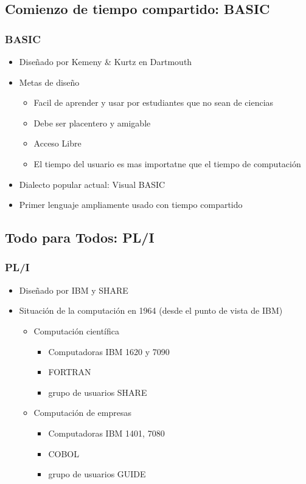 \documentclass[11pt]{article}
\begin{document}
\subsection*{Comienzo de tiempo compartido: BASIC}
\label{sec:orgheadline70}

\subsubsection*{BASIC}
\label{sec:orgheadline69}
\begin{itemize}
\item Diseñado por Kemeny \& Kurtz en Dartmouth
\item Metas de diseño
\begin{itemize}
\item Facil de aprender y usar por estudiantes que no sean de ciencias
\item Debe ser placentero y amigable
\item Acceso Libre
\item El tiempo del usuario es mas importatne que el tiempo de computación
\end{itemize}
\item Dialecto popular actual: Visual BASIC
\item Primer lenguaje ampliamente usado con tiempo compartido
\end{itemize}

\subsection*{Todo para Todos: PL/I}
\label{sec:orgheadline75}

\subsubsection*{PL/I}
\label{sec:orgheadline71}
\begin{itemize}
\item Diseñado por IBM y SHARE
\item Situación de la computación en 1964 (desde el punto de vista de IBM)
\begin{itemize}
\item Computación científica
\begin{itemize}
\item Computadoras IBM 1620 y 7090
\item FORTRAN
\item grupo de usuarios SHARE
\end{itemize}
\item Computación de empresas
\begin{itemize}
\item Computadoras IBM 1401, 7080
\item COBOL
\item grupo de usuarios GUIDE
\end{itemize}
\end{itemize}
\end{itemize}
\end{document}
